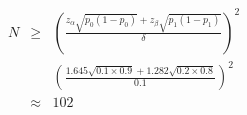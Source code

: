 \documentclass[12pt]{article}
\begin{document}
\pagestyle{empty}
\large

\[
\begin{array}{lcl}
N & \ge & \left( \frac{z_{\alpha} \sqrt{p_0(1 - p_0)} + z_{\beta} \sqrt{p_1(1 - p_1)}} {\delta} \right) ^2 \\
  & & \left( \frac{1.645 \sqrt{0.1 \times 0.9} + 1.282 \sqrt{0.2 \times 0.8}} {0.1} \right) ^2 \\
 & \approx & 102
\end{array}
\]
\end{document}
